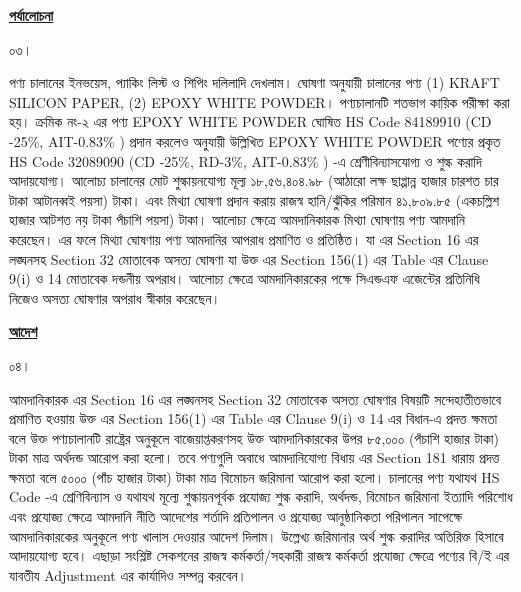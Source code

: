 \documentclass[12pt]{article}
\begin{document}
\begin{center}
\textbf{\underline{পর্যালোচনা}}
\end{center}
\begin{minipage}[t]{0.05\linewidth}
০৩।
\end{minipage}
\begin{minipage}[t]{0.95\linewidth}
পণ্য চালানের ইনভয়েস, প্যাকিং লিস্ট ও
শিপিং দলিলাদি দেখলাম।
ঘোষণা অনুযায়ী চালানের পণ্য
(1) KRAFT SILICON PAPER,
(2) EPOXY WHITE POWDER।
পণ্যচালানটি শতভাগ কায়িক পরীক্ষা করা হয়।
ক্রমিক নং-২ এর পণ্য
EPOXY WHITE POWDER
ঘোষিত HS Code 84189910
(CD -25\%, AIT-0.83\% )
প্রদান করলেও
{\fsen}
অনুযায়ী উল্লিখিত
EPOXY WHITE POWDER
পণ্যের প্রকৃত HS Code 32089090
(CD -25\%, RD-3\%, AIT-0.83\% ) -এ
শ্রেণীবিন্যাসযোগ্য ও শুল্ক করাদি আদায়যোগ্য।
আলোচ্য চালানের মোট
শুল্কায়নযোগ্য মূল্য
১৮,৫৬,৪০৪.৯৮ (আঠারো লক্ষ ছাপ্পান্ন হাজার চারশত চার টাকা আটানব্বই পয়সা) টাকা।
এবং মিথ্যা ঘোষণা প্রদান করায় রাজস্ব হানি/ঝুঁকির পরিমান
৪১,৮০৯.৮৫
(একচল্লিশ হাজার আটশত নয় টাকা পঁচাশি পয়সা) টাকা।
আলোচ্য ক্ষেত্রে আমদানিকারক মিথ্যা ঘোষণায়
পণ্য আমদানি করেছেন।
এর ফলে মিথ্যা ঘোষণায় পণ্য আমদানির আপরাধ
প্রমাণিত ও প্রতিষ্ঠিত।
যা {\tca} এর Section 16 এর
লঙ্ঘনসহ Section 32 মোতাবেক
অসত্য ঘোষণা যা উক্ত {\tca}
এর Section 156(1) এর Table এর
Clause 9(i) ও 14 মোতাবেক দন্ডনীয় অপরাধ।
আলোচ্য ক্ষেত্রে আমদানিকারকের পক্ষে সিএন্ডএফ
এজেন্টের প্রতিনিধি নিজেও অসত্য ঘোষণার অপরাধ
স্বীকার করেছেন।
\end{minipage}
\begin{center}
\textbf{\underline{আদেশ}}
\end{center}
\begin{minipage}[t]{0.05\linewidth}
০৪।
\end{minipage}
\begin{minipage}[t]{0.95\linewidth}
আমদানিকারক {\tca} এর Section 16
এর লঙ্ঘনসহ Section 32 মোতাবেক
অসত্য ঘোষণার বিষয়টি সন্দেহাতীতভাবে প্রমাণিত
হওয়ায় উক্ত {\tca} এর Section 156(1) এর
Table এর Clause 9(i) ও 14 এর বিধান-এ প্রদত্ত
ক্ষমতা বলে উক্ত পণ্যচালানটি
রাষ্ট্রের অনুকূলে বাজেয়াপ্তকরণসহ উক্ত আমদানিকারকের
উপর
৮৫,০০০ (পঁচাশি হাজার টাকা) টাকা
মাত্র অর্থদন্ড আরোপ করা হলো। তবে পণ্যগুলি অবাধে আমদানিযোগ্য
বিধায় {\tca} এর Section 181 ধারায় প্রদত্ত ক্ষমতা
বলে
৫০০০ (পাঁচ হাজার টাকা) টাকা মাত্র
বিমোচন জরিমানা আরোপ করা হলো।
চালানের পণ্য যথাযথ HS Code -এ শ্রেণিবিন্যাস ও যথাযথ
মূল্যে শুল্কায়নপূর্বক প্রযোজ্য শুল্ক করাদি, অর্থদন্ড, বিমোচন জরিমানা
ইত্যাদি পরিশোধ এবং প্রযোজ্য ক্ষেত্রে আমদানি নীতি আদেশের
শর্তাদি প্রতিপালন ও প্রযোজ্য আনুষ্ঠানিকতা পরিপালন সাপেক্ষে
আমদানিকারকের অনুকূলে পণ্য খালাস দেওয়ার আদেশ দিলাম।
উল্লেখ্য জরিমানার অর্থ শুল্ক করাদির অতিরিক্ত হিসাবে আদায়যোগ্য
হবে। এছাড়া সংশ্লিষ্ট সেকশনের রাজস্ব কর্মকর্তা/সহকারী রাজস্ব কর্মকর্তা
প্রযোজ্য ক্ষেত্রে পণ্যের বি/ই এর যাবতীয Adjustment এর কার্যাদিও সম্পন্ন করবেন।
\\
\\
\\
\\
\\
\end{minipage}
\end{document}
